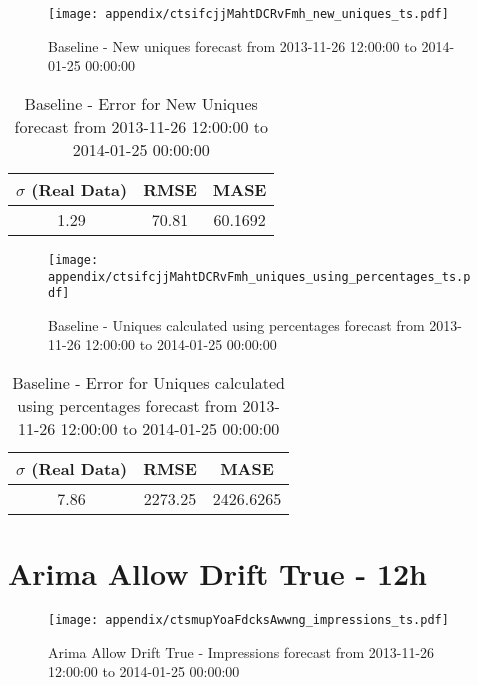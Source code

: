 \begin{figure}[H] \begin{center} \leavevmode
\texttt{[image: appendix/ctsifcjjMahtDCRvFmh\_new\_uniques\_ts.pdf]} \caption{
Baseline - New uniques forecast from 2013-11-26 12:00:00 to 2014-01-25 00:00:00} \label{fig:appendix/ctsifcjjMahtDCRvFmh_new_uniques_ts.pdf} \end{center}
\end{figure}

\begin{table}[H]
\centering
\footnotesize
\begin{tabular}{ccc}
$\sigma$ (Real Data) & RMSE & MASE   \\ \hline
1.29 & 70.81 & 60.1692 \\
\end{tabular}

\vspace{0.5cm}

\caption{
Baseline - Error for New Uniques forecast from 2013-11-26 12:00:00 to 2014-01-25 00:00:00}
\end{table}

\begin{figure}[H] \begin{center} \leavevmode
\texttt{[image: appendix/ctsifcjjMahtDCRvFmh\_uniques\_using\_percentages\_ts.pdf]} \caption{
Baseline - Uniques calculated using percentages forecast from 2013-11-26 12:00:00 to 2014-01-25 00:00:00} \label{fig:appendix/ctsifcjjMahtDCRvFmh_uniques_using_percentages_ts.pdf} \end{center}
\end{figure}

\begin{table}[H]
\centering
\footnotesize
\begin{tabular}{ccc}
$\sigma$ (Real Data) & RMSE & MASE   \\ \hline
7.86 & 2273.25 & 2426.6265 \\
\end{tabular}

\vspace{0.5cm}

\caption{
Baseline - Error for Uniques calculated using percentages forecast from 2013-11-26 12:00:00 to 2014-01-25 00:00:00}
\end{table}

\section{Arima Allow Drift True - 12h}
\begin{figure}[H] \begin{center} \leavevmode
\texttt{[image: appendix/ctsmupYoaFdcksAwwng\_impressions\_ts.pdf]} \caption{
Arima Allow Drift True - Impressions forecast from 2013-11-26 12:00:00 to 2014-01-25 00:00:00} \label{fig:appendix/ctsmupYoaFdcksAwwng_impressions_ts.pdf} \end{center}
\end{figure}

